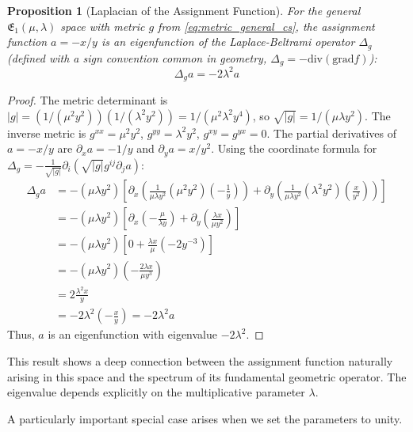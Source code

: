 \documentclass[12pt]{article}
\newtheorem{proposition}{Proposition}[section]
\begin{document}
\begin{proposition}[Laplacian of the Assignment Function]\label{prop:laplacian_general_cs}
For the general \( \mathfrak{E}_1(\mu, \lambda) \) space with metric \( g \) from \eqref{eq:metric_general_cs}, the assignment function \( a = -x/y \) is an eigenfunction of the Laplace-Beltrami operator \( \Delta_g \) (defined with a sign convention common in geometry, \( \Delta_g = -\text{div}(\text{grad} f) \)):
\[
\Delta_g a = -2\lambda^2 a
\]
\end{proposition}
\begin{proof}
The metric determinant is \( |g| = (1/(\mu^2 y^2))(1/(\lambda^2 y^2)) = 1/(\mu^2 \lambda^2 y^4) \), so \( \sqrt{|g|} = 1/(\mu \lambda y^2) \). The inverse metric is \( g^{xx} = \mu^2 y^2 \), \( g^{yy} = \lambda^2 y^2 \), \( g^{xy}=g^{yx}=0 \).
The partial derivatives of \( a = -x/y \) are \( \partial_x a = -1/y \) and \( \partial_y a = x/y^2 \).
Using the coordinate formula for \( \Delta_g = - \frac{1}{\sqrt{|g|}} \partial_i (\sqrt{|g|} g^{ij} \partial_j a) \):
\begin{align*}
\Delta_g a &= - (\mu \lambda y^2) \left[ \partial_x \left( \frac{1}{\mu \lambda y^2} (\mu^2 y^2) (-\frac{1}{y}) \right) + \partial_y \left( \frac{1}{\mu \lambda y^2} (\lambda^2 y^2) (\frac{x}{y^2}) \right) \right] \\
&= - (\mu \lambda y^2) \left[ \partial_x \left( - \frac{\mu}{\lambda y} \right) + \partial_y \left( \frac{\lambda x}{\mu y^2} \right) \right] \\
&= - (\mu \lambda y^2) \left[ 0 + \frac{\lambda x}{\mu} (-2 y^{-3}) \right] \\
&= - (\mu \lambda y^2) \left( - \frac{2 \lambda x}{\mu y^3} \right) \\
&= 2 \frac{\lambda^2 x}{y} \\
&= -2 \lambda^2 \left( - \frac{x}{y} \right) = -2 \lambda^2 a
\end{align*}
Thus, \( a \) is an eigenfunction with eigenvalue \( -2\lambda^2 \).
\end{proof}

This result shows a deep connection between the assignment function naturally arising in this space and the spectrum of its fundamental geometric operator. The eigenvalue depends explicitly on the multiplicative parameter \( \lambda \).

A particularly important special case arises when we set the parameters to unity.
\end{document}
